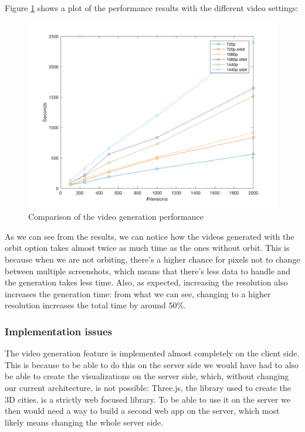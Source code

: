 \documentclass[]{usiinfbachelorproject}
\begin{document}
Figure \ref{fig:plot} shows a plot of the performance results with the different video settings:

\begin{figure} [H]
\centering
\includegraphics[width=1\textwidth]{pictures/figure1.png}
\caption{Comparison of the video generation performance}
\label{fig:plot}
\end{figure}

As we can see from the results, we can notice how the videos generated with the orbit option takes almost twice as much time
as the ones without orbit. This is because when we are not orbiting, there's a higher chance for pixels not to change between multiple screenshots, which means that there's less data to handle and the generation takes less time.
Also, as expected, increasing the resolution also increases the generation time: from what we can see, changing to a higher resolution increases the total time by around 50\%.

\subsubsection{Implementation issues} \label{Implementation issues}

The video generation feature is implemented almost completely on the client side. This is because to be able to do this on the server side we would have had to also be able to create the visualizations on the server side, which, without changing our current architecture, is not possible: Three.js, the library used to create the 3D cities, is a strictly web focused library. To be able to use it on the server we then would need a way to build a second web app on the server, which most likely means changing the whole server side.
\end{document}
